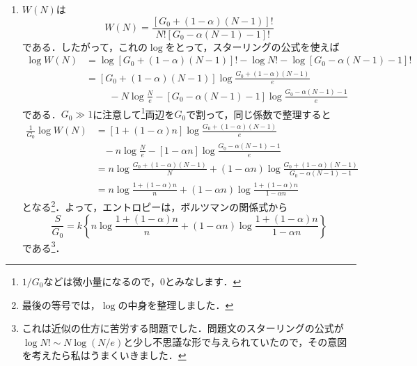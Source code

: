 \documentclass[a4paper,pdflatex,ja=standard]{bxjsarticle}
\begin{document}
\begin{enumerate}
  \item 
  $W(N)$は
  \begin{equation}
    W(N)
    =
    \frac{[G_{0}+(1-\alpha)(N-1)]!}{N![G_{0}-\alpha(N-1)-1]!}
  \end{equation}
  である．したがって，これの$\log$をとって，スターリングの公式を使えば
  \begin{align}
    \log W(N)
    &=
    \log [G_{0}+(1-\alpha)(N-1)]!
    -
    \log N!
    -
    \log [G_{0}-\alpha(N-1)-1]!
    \nonumber
    \\
    &=
    [G_{0}+(1-\alpha)(N-1)]\log\frac{G_{0}+(1-\alpha)(N-1)}{e}
    \nonumber
    \\
    &\hspace{1cm}
    -
    N\log \frac{N}{e}
    -
    [G_{0}-\alpha(N-1)-1]
    \log\frac{G_{0}-\alpha(N-1)-1}{e}
  \end{align}
  である．$G_{0}\gg 1$に注意して\footnote{
    $1/G_{0}$などは微小量になるので，$0$とみなします．
  }両辺を$G_{0}$で割って，同じ係数で整理すると
  \begin{align}
    \frac{1}{G_{0}}\log W(N)
    &=
    [1+(1-\alpha)n]\log\frac{G_{0}+(1-\alpha)(N-1)}{e}
    \nonumber
    \\
    &\hspace{10pt}
    -
    n\log \frac{N}{e}
    -
    [1-\alpha n]
    \log\frac{G_{0}-\alpha(N-1)-1}{e}
    \nonumber
    \\
    &=
    n\log\frac{G_{0}+(1-\alpha)(N-1)}{N}
    +
    (1-\alpha n)\log\frac{G_{0}+(1-\alpha)(N-1)}{G_{0}-\alpha(N-1)-1}
    \nonumber
    \\
    &=
    n\log\frac{1+(1-\alpha)n}{n}
    +
    (1-\alpha n)\log\frac{1+(1-\alpha)n}{1-\alpha n}
    \label{states}
  \end{align}
  となる\footnote{
    最後の等号では，$\log$の中身を整理しました．
  }．よって，エントロピーは，ボルツマンの関係式から
  \begin{equation}
    \frac{S}{G_{0}}
    =
    k
    \left\{  
      n\log\frac{1+(1-\alpha)n}{n}
    +
    (1-\alpha n)\log\frac{1+(1-\alpha)n}{1-\alpha n}
    \right\}
  \end{equation}
  である\footnote{
    これは近似の仕方に苦労する問題でした．問題文のスターリングの公式が$\log N!\sim N\log(N/e)$と少し不思議な形で与えられていたので，その意図を考えたら私はうまくいきました．

  }．


\end{enumerate}
\end{document}
